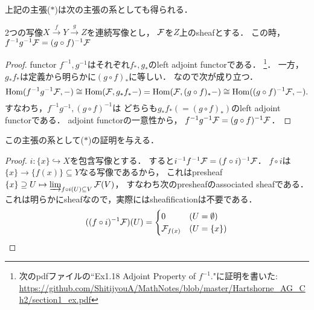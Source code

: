 \documentclass[a4paper]{jsarticle}
\begin{document}
上記の主張($*$)は次の主張の系としても得られる．
\begin{Claim}
    2つの写像$X \xrightarrow{f} Y \xrightarrow{g} Z$を連続写像とし，
    $\mathcal{F}$を$Z$上のsheafとする．
    この時，$f^{-1}g^{-1}\mathcal{F}=(g \circ f)^{-1}\mathcal{F}$
\end{Claim}
\begin{proof}
    functor $f^{-1}, g^{-1}$はそれぞれ$f_*,g_*$のleft adjoint functorである．
    \footnote
    {
        次のpdfファイルの``Ex1.18 Adjoint Property of $f^{-1}$."に証明を書いた:
        \url{https://github.com/ShitijyouA/MathNotes/blob/master/Hartshorne_AG_Ch2/section1_ex.pdf}
    }．
    一方，$g_* f_*$は定義から明らかに$(g \circ f)_*$に等しい．
    なので次が成り立つ．
    \[
        \operatorname{Hom}(f^{-1}g^{-1}\mathcal{F}, -)
        \cong \operatorname{Hom}(\mathcal{F}, g_* f_* -)
        =\operatorname{Hom}(\mathcal{F}, (g \circ f)_* -)
        \cong \operatorname{Hom}((g \circ f)^{-1} \mathcal{F},  -).
    \]
    すなわち，$f^{-1}g^{-1}, (g \circ f)^{-1}$は
    どちらも$g_* f_*(=(g \circ f)_*)$のleft adjoint functorである．
    adjoint functorの一意性から，
    $f^{-1}g^{-1}\mathcal{F}=(g \circ f)^{-1}\mathcal{F}$．
\end{proof}

この主張の系として($*$)の証明を与える．
\begin{proof}
    $i: \{x\} \hookrightarrow X$を包含写像とする．
    すると$i^{-1}f^{-1} \mathcal{F}=(f \circ i)^{-1} \mathcal{F}$．
    $f \circ i$は$\{x\} \to \{f(x)\} \subseteq Y$なる写像であるから，
    これはpresheaf $\{x\} \supseteq U  \mapsto \varinjlim_{f \circ i(U) \subseteq V} \mathcal{F}(V)$，
    すなわち次のpresheafのassociated sheafである．
    これは明らかにsheafなので，実際にはsheafificationは不要である．
    \[
        ((f \circ i)^{-1}\mathcal{F})(U)=
        \begin{cases}{}
            0 & (U=\emptyset) \\
            \mathcal{F}_{f(x)} & (U=\{x\})
        \end{cases}
    \]
\end{proof}
\end{document}
